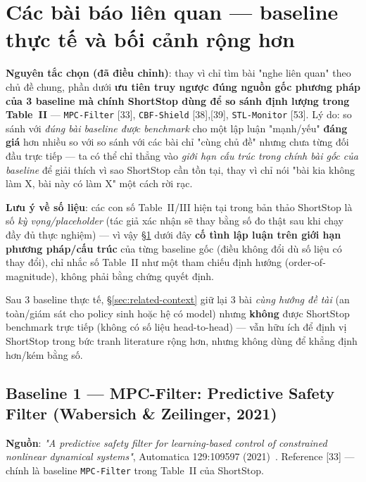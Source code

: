 \documentclass[a4paper,12pt]{article}
\let\stdsection\section
\renewcommand{\section}{\clearpage\stdsection}
\begin{document}
\section{Các bài báo liên quan --- baseline thực tế và bối cảnh rộng hơn}\label{sec:related}
\textbf{Nguyên tắc chọn (đã điều chỉnh)}: thay vì chỉ tìm bài "nghe liên quan" theo chủ đề chung, phần dưới \textbf{ưu tiên truy ngược đúng nguồn gốc phương pháp của 3 baseline mà chính ShortStop dùng để so sánh định lượng trong Table~II} --- \texttt{MPC-Filter} [33], \texttt{CBF-Shield} [38],[39], \texttt{STL-Monitor} [53]. Lý do: so sánh với \emph{đúng bài baseline được benchmark} cho một lập luận "mạnh/yếu" \textbf{đáng giá} hơn nhiều so với so sánh với các bài chỉ "cùng chủ đề" nhưng chưa từng đối đầu trực tiếp --- ta có thể chỉ thẳng vào \emph{giới hạn cấu trúc trong chính bài gốc của baseline} để giải thích vì sao ShortStop cần tồn tại, thay vì chỉ nói "bài kia không làm X, bài này có làm X" một cách rời rạc.

\textbf{Lưu ý về số liệu}: các con số Table~II/III hiện tại trong bản thảo ShortStop là số \emph{kỳ vọng/placeholder} (tác giả xác nhận sẽ thay bằng số đo thật sau khi chạy đầy đủ thực nghiệm) --- vì vậy \S\ref{sec:related} dưới đây \textbf{cố tình lập luận trên giới hạn phương pháp/cấu trúc} của từng baseline gốc (điều không đổi dù số liệu có thay đổi), chỉ nhắc số Table~II như một tham chiếu định hướng (order-of-magnitude), không phải bằng chứng quyết định.

Sau 3 baseline thực tế, \S\ref{sec:related-context} giữ lại 3 bài \emph{cùng hướng đề tài} (an toàn/giám sát cho policy sinh hoặc hệ có model) nhưng \textbf{không} được ShortStop benchmark trực tiếp (không có số liệu head-to-head) --- vẫn hữu ích để định vị ShortStop trong bức tranh literature rộng hơn, nhưng không dùng để khẳng định hơn/kém bằng số.

\subsection{Baseline 1 --- MPC-Filter: Predictive Safety Filter (Wabersich \& Zeilinger, 2021)}
\textbf{Nguồn}: \emph{"A predictive safety filter for learning-based control of constrained nonlinear dynamical systems"}, Automatica 129:109597 (2021)~\cite{wabersich2021predictive}. Reference [33] --- chính là baseline \texttt{MPC-Filter} trong Table~II của ShortStop.
\end{document}
